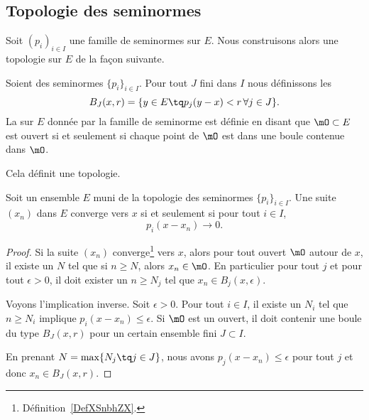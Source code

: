 \subsection{Topologie des seminormes}


Soit \( (p_i)_{i\in I}\) une famille de seminormes sur \( E\). Nous construisons alors une topologie sur \( E\) de la façon suivante.

\begin{propositionDef}      \label{DEFooZTKAooWYUyDa}
	Soient des seminormes \( \{ p_i \}_{i\in I}\). Pour tout \( J\) fini dans \( I\) nous définissons les 
	\begin{equation}
		B_J(x,r)=\{ y\in E\tq p_j(y-x)<r\,\forall j\in J \}.
	\end{equation}
	La  sur \( E\) donnée par la famille de seminorme est définie en disant que \( \mO\subset E\) est ouvert si et seulement si chaque point de \( \mO\) est dans une boule contenue dans \( \mO\).

	Cela définit une topologie.
\end{propositionDef}

\begin{proposition} \label{PropQPzGKVk}
	Soit un ensemble \( E\) muni de la topologie des seminormes \( \{ p_i \}_{i\in I}\). Une suite \( (x_n)\) dans \( E\) converge vers \( x\) si et seulement si pour tout \( i\in I\),
	\begin{equation}
		p_i(x-x_n)\to 0.
	\end{equation}
\end{proposition}

\begin{proof}
	Si la suite \( (x_n)\) converge\footnote{Définition~\ref{DefXSnbhZX}.} vers \( x\), alors pour tout ouvert \( \mO\) autour de \( x\), il existe un \( N\) tel que si \( n\geq N\), alors \( x_n\in\mO\). En particulier pour tout \( j\) et pour tout \( \epsilon>0\), il doit exister un \( n\geq N_j\) tel que \( x_n\in B_j(x,\epsilon)\).

	Voyons l'implication inverse. Soit \( \epsilon>0\). Pour tout \( i\in I\), il existe un \( N_i\) tel que \( n\geq N_i\) implique \( p_i(x-x_n)\leq \epsilon\). Si \( \mO\) est un ouvert, il doit contenir une boule du type \( B_J(x,r)\) pour un certain ensemble fini \( J\subset I\).

	En prenant \( N=\max\{ N_j\tq j\in J \}\), nous avons \( p_j(x-x_n)\leq \epsilon\) pour tout \( j\) et donc \( x_n\in B_J(x,r)\).
\end{proof}

